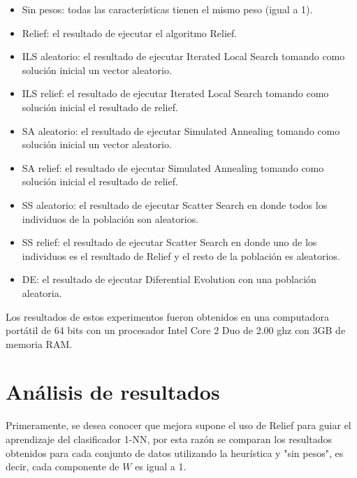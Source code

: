 \documentclass{ci5652}
\begin{document}
\begin{itemize}
  \item Sin pesos: todas las características tienen el mismo peso (igual a 1).
  \item Relief: el resultado de ejecutar el algoritmo Relief.
  \item ILS aleatorio: el resultado de ejecutar Iterated Local Search tomando
  como solución inicial un vector aleatorio.
  \item ILS relief: el resultado de ejecutar Iterated Local Search tomando como
  solución inicial el resultado de relief.
  \item SA aleatorio: el resultado de ejecutar Simulated Annealing tomando como
  solución inicial un vector aleatorio.
  \item SA relief: el resultado de ejecutar Simulated Annealing tomando como
  solución inicial el resultado de relief.
  \item SS aleatorio: el resultado de ejecutar Scatter Search en donde todos los
  individuos de la población son aleatorios.
  \item SS relief: el resultado de ejecutar Scatter Search en donde uno de los
  individuos es el resultado de Relief y el resto de la población es aleatorios.
  \item DE: el resultado de ejecutar Diferential Evolution con una población
  aleatoria.
\end{itemize}

Los resultados de estos experimentos fueron obtenidos en una computadora
portátil de 64 bits con un procesador Intel Core 2 Duo de 2.00 ghz con 3GB de
memoria RAM.


\section{Análisis de resultados}

Primeramente, se desea conocer que mejora supone el uso de Relief para guiar el
aprendizaje del clasificador 1-NN, por esta razón se comparan los resultados
obtenidos para cada conjunto de datos utilizando la heurística y "sin pesos", es
decir, cada componente de $W$ es igual a 1.\\
\end{document}
